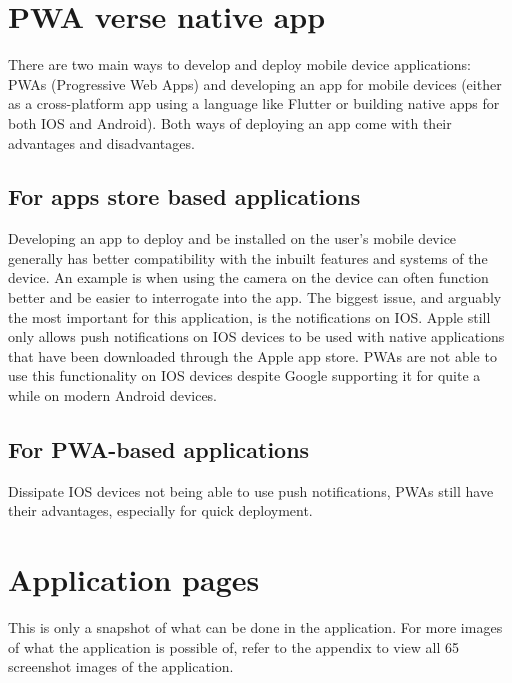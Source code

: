 \section{PWA verse native app}
There are two main ways to develop and deploy mobile device applications: PWAs (Progressive Web Apps) and developing an app for mobile devices (either as a cross-platform app using a language like Flutter or building native apps for both IOS and Android). Both ways of deploying an app come with their advantages and disadvantages.

\subsection{For apps store based applications}
Developing an app to deploy and be installed on the user's mobile device generally has better compatibility with the inbuilt features and systems of the device. An example is when using the camera on the device can often function better and be easier to interrogate into the app. The biggest issue, and arguably the most important for this application, is the notifications on IOS. Apple still only allows push notifications on IOS devices to be used with native applications that have been downloaded through the Apple app store. PWAs are not able to use this functionality on IOS devices despite Google supporting it for quite a while on modern Android devices.

\subsection{For PWA-based applications}
Dissipate IOS devices not being able to use push notifications, PWAs still have their advantages, especially for quick deployment.

\section{Application pages}

This is only a snapshot of what can be done in the application. For more images of what the application is possible of, refer to the appendix to view all 65 screenshot images of the application.

